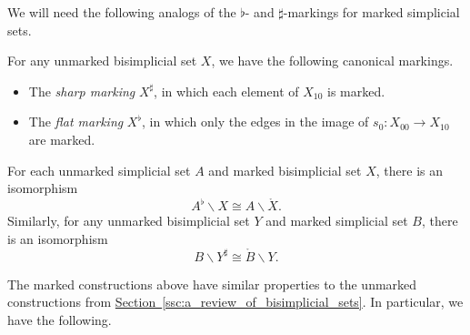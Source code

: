 \documentclass[main.tex]{subfiles}
\begin{document}
We will need the following analogs of the $\flat$- and $\sharp$-markings for marked simplicial sets.

\begin{example}
  For any unmarked bisimplicial set $X$, we have the following canonical markings.
  \begin{itemize}
    \item The \emph{sharp marking} $X^{\sharp}$, in which each element of $X_{10}$ is marked.

    \item The \emph{flat marking} $X^{\flat}$, in which only the edges in the image of $s_{0}\colon X_{00} \to X_{10}$ are marked.
  \end{itemize}
\end{example}

\begin{example}
  For each unmarked simplicial set $A$ and marked bisimplicial set $X$, there is an isomorphism
  \begin{equation*}
    A^{\flat} \backslash X \cong A \backslash \mathring{X}.
  \end{equation*}
  Similarly, for any unmarked bisimplicial set $Y$ and marked simplicial set $B$, there is an isomorphism
  \begin{equation*}
    B \backslash Y^{\sharp} \cong \mathring{B} \backslash Y.
  \end{equation*}
\end{example}

The marked constructions above have similar properties to the unmarked constructions from \hyperref[ssc:a_review_of_bisimplicial_sets]{Section~\ref*{ssc:a_review_of_bisimplicial_sets}}. In particular, we have the following.
\end{document}
